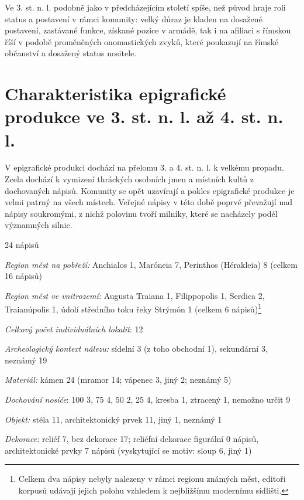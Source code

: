 Ve 3. st. n. l. podobně jako v předcházejícím století spíše, než původ hraje roli status a postavení v rámci komunity: velký důraz je kladen na dosažené postavení, zastávané funkce, získané pozice v armádě, tak i na afiliaci s římskou říší v podobě proměněných onomastických zvyků, které poukazují na římské občanství a dosažený status nositele.

\section[charakteristika-epigrafické-produkce-ve-3.-st.-n.-l.-až-4.-st.-n.-l.]{Charakteristika epigrafické produkce ve 3. st. n. l. až 4. st. n. l.}

V epigrafické produkci dochází na přelomu 3. a 4. st. n. l. k velkému propadu. Zcela dochází k vymizení thráckých osobních jmen a místních kultů z dochovaných nápisů. Komunity se opět uzavírají a pokles epigrafické produkce je velmi patrný na všech místech. Veřejné nápisy v této době poprvé převažují nad nápisy soukromými, z nichž polovinu tvoří milníky, které se nacházely podél významných silnic.

\placetable[none]{}
\starttable[|l|]
\HL
{} 24 nápisů

{\em Region měst na pobřeží:} Anchialos 1, Maróneia 7, Perinthos (Hérakleia) 8 (celkem 16 nápisů)

{\em Region měst ve vnitrozemí:} Augusta Traiana 1, Filippopolis 1, Serdica 2, Traianúpolis 1, údolí středního toku řeky Strýmón 1 (celkem 6 nápisů)\footnote{Celkem dva nápisy nebyly nalezeny v rámci regionu známých měst, editoři korpusů udávají jejich polohu vzhledem k nejbližšímu modernímu sídlišti.}

{\em Celkový počet individuálních lokalit}: 12

{\em Archeologický kontext nálezu:} sídelní 3 (z toho obchodní 1), sekundární 3, neznámý 19

{\em Materiál:} kámen 24 (mramor 14; vápenec 3, jiný 2; neznámý 5)

{\em Dochování nosiče}: 100  3, 75  4, 50  2, 25  4, kresba 1, ztracený 1, nemožno určit 9

{\em Objekt:} stéla 11, architektonický prvek 11, jiný 1, neznámý 1

{\em Dekorace:} reliéf 7, bez dekorace 17; reliéfní dekorace figurální 0 nápisů, architektonické prvky 7 nápisů (vyskytující se motiv: sloup 6, jiný 1)

